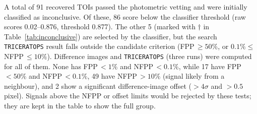 A total of 91 recovered TOIs passed the photometric vetting and were initially classified as inconclusive.
Of these, 86 score below the classifier threshold (raw scores
0.02--0.876, threshold 0.877).
The other 5 (marked with $\dagger$ in Table~\ref{tab:inconclusive}) are selected by the classifier,
but the search \texttt{TRICERATOPS} result falls outside the candidate criterion
(FPP\,$\geq 50\%$, or $0.1\% \leq$\,NFPP\,$\leq 10\%$).
Difference images and \texttt{TRICERATOPS} (three runs) were computed for all of them. None has FPP\,$<1\%$ and NFPP\,$<0.1\%$,
while 17 have FPP\,$<50\%$ and NFPP\,$<0.1\%$, 49 have NFPP\,$>10\%$ (signal likely from a
neighbour), and 2 show a significant difference-image offset ($>4\sigma$ and $>0.5$ pixel).
Signals above the NFPP or offset limits would be rejected by these tests; they are kept in the
table to show the full group.
